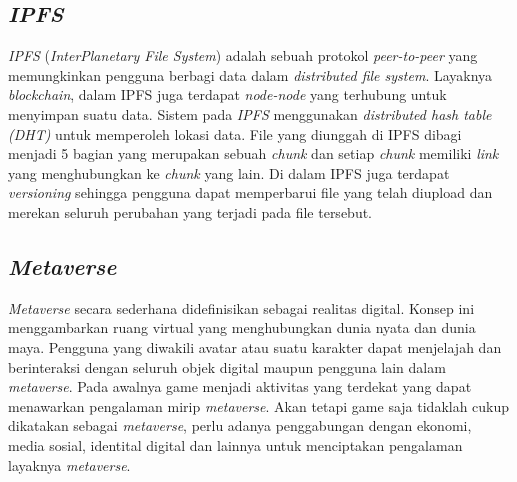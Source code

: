 

\subsection{\emph{IPFS}}
\emph{IPFS} (\emph{InterPlanetary File System}) adalah sebuah protokol \emph{peer-to-peer} yang memungkinkan pengguna berbagi data dalam \emph{distributed file system}. Layaknya \emph{blockchain}, dalam IPFS juga terdapat \emph{node-node} yang terhubung untuk menyimpan suatu data. Sistem pada \emph{IPFS} menggunakan \emph{distributed hash table (DHT)} untuk memperoleh lokasi data. File yang diunggah di IPFS dibagi menjadi 5 bagian yang merupakan sebuah \emph{chunk} dan setiap \emph{chunk} memiliki \emph{link} yang menghubungkan ke \emph{chunk} yang lain. Di dalam IPFS juga terdapat \emph{versioning} sehingga pengguna dapat memperbarui file yang telah diupload dan merekan seluruh perubahan yang terjadi pada file tersebut. \parencite{MathisSteichen}

\subsection{\emph{Metaverse}}
\emph{Metaverse} secara sederhana didefinisikan sebagai realitas digital. Konsep ini menggambarkan ruang virtual yang menghubungkan dunia nyata dan dunia maya. Pengguna yang diwakili avatar atau suatu karakter dapat menjelajah dan berinteraksi dengan seluruh objek digital maupun pengguna lain dalam \emph{metaverse}. Pada awalnya game menjadi aktivitas yang terdekat yang dapat menawarkan pengalaman mirip \emph{metaverse}. Akan tetapi game saja tidaklah cukup dikatakan sebagai \emph{metaverse}, perlu adanya penggabungan dengan ekonomi, media sosial, identital digital dan lainnya untuk menciptakan pengalaman layaknya \emph{metaverse}. 


